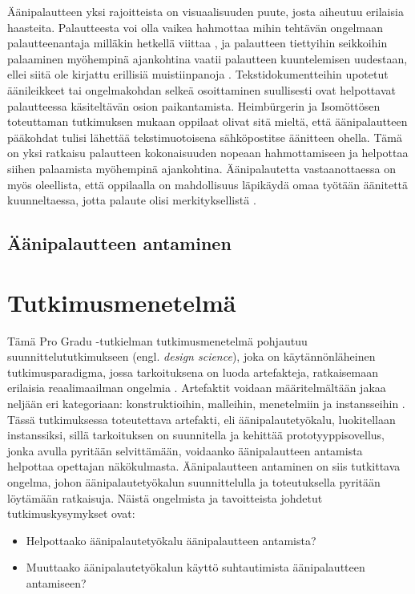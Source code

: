 \documentclass[utf8]{gradu3}
\begin{document}
Äänipalautteen yksi rajoitteista on visuaalisuuden puute, josta aiheutuu erilaisia haasteita. Palautteesta voi olla vaikea hahmottaa mihin tehtävän ongelmaan palautteenantaja milläkin hetkellä viittaa \parencite[][]{versus}, ja palautteen tiettyihin seikkoihin palaaminen myöhempinä ajankohtina vaatii palautteen kuuntelemisen uudestaan, ellei siitä ole kirjattu erillisiä muistiinpanoja \parencite[][]{evaluating}. Tekstidokumentteihin upotetut äänileikkeet tai ongelmakohdan selkeä osoittaminen suullisesti ovat helpottavat palautteessa käsiteltävän osion paikantamista. Heimbürgerin ja Isomöttösen \parencite[][]{moderating} toteuttaman tutkimuksen mukaan oppilaat olivat sitä mieltä, että äänipalautteen pääkohdat tulisi lähettää tekstimuotoisena sähköpostitse äänitteen ohella. Tämä on yksi ratkaisu palautteen kokonaisuuden nopeaan hahmottamiseen ja helpottaa siihen palaamista myöhempinä ajankohtina. Äänipalautetta vastaanottaessa on myös oleellista, että oppilaalla on mahdollisuus läpikäydä omaa työtään äänitettä kuunneltaessa, jotta palaute olisi merkityksellistä \parencite[][]{usingAudio}.

\section{Äänipalautteen antaminen}


%

\chapter{Tutkimusmenetelmä}

Tämä Pro Gradu -tutkielman tutkimusmenetelmä pohjautuu suunnittelututkimukseen (engl. \textit{design science}), joka on käytännönläheinen tutkimusparadigma, jossa tarkoituksena on luoda artefakteja, ratkaisemaan erilaisia reaalimaailman ongelmia \parencite[][]{hevner2004}. Artefaktit voidaan määritelmältään jakaa neljään eri kategoriaan: konstruktioihin, malleihin, menetelmiin ja instansseihin \parencite[][]{hevner2004}. Tässä tutkimuksessa toteutettava artefakti, eli äänipalautetyökalu, luokitellaan instanssiksi, sillä tarkoituksen on suunnitella ja kehittää prototyyppisovellus, jonka avulla pyritään selvittämään, voidaanko äänipalautteen antamista helpottaa opettajan näkökulmasta. Äänipalautteen antaminen on siis tutkittava ongelma, johon äänipalautetyökalun suunnittelulla ja toteutuksella pyritään löytämään ratkaisuja. Näistä ongelmista ja tavoitteista johdetut tutkimuskysymykset ovat:

\begin{itemize}
  \item Helpottaako äänipalautetyökalu äänipalautteen antamista?
  \item Muuttaako äänipalautetyökalun käyttö suhtautimista äänipalautteen antamiseen?
\end{itemize}
\end{document}
